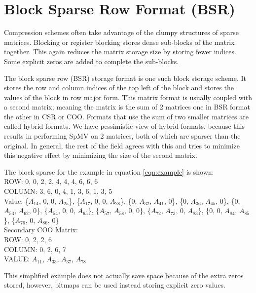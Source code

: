 \section{Block Sparse Row Format (BSR)}
\par Compression schemes often take advantage of the clumpy structures of sparse matrices. Blocking or register blocking stores dense sub-blocks of the matrix together. This again reduces the matrix storage size by storing fewer indices. Some explicit zeros are added to complete the sub-blocks.
\par The block sparse row (BSR) storage format is one such block storage scheme. It stores the row and column indices of the top left of the block and stores the values of the block in row major form. This matrix format is usually coupled with a second matrix; meaning the matrix is the sum of 2 matrices one in BSR format the other in CSR or COO. Formats that use the sum of two smaller matrices are called hybrid formats. We have pessimistic view of hybrid formats, because this results in performing SpMV on 2 matrices, both of which are sparser than the original. In general, the rest of the field agrees with this and tries to minimize this negative effect by minimizing the size of the second matrix. \par
The block sparse for the example in equation \ref{eqn:example} is shown:\\
ROW: 0, 0, 2, 2, 4, 4, 4, 6, 6, 6\\
COLUMN: 3, 6, 0, 4, 1, 3, 6, 1, 3, 5 \\
Value: \{$A_{14}$, $0$, $0$, $A_{25}$\}, \{$A_{17}$, $0$, $0$, $A_{28}$\}, \{$0$, $A_{32}$, $A_{41}$, $0$\}, \{$0$, $A_{36}$, $A_{45}$, $0$\}, \{$0$, $A_{53}$, $A_{62}$, $0$\}, \{$A_{54}$, $0$, $0$, $A_{65}$\}, \{$A_{57}$, $A_{58}$, $0$, $0$\}, \{$A_{72}$, $A_{73}$, $0$, $A_{83}$\}, \{$0$, $0$, $A_{84}$, $A_{85}$\}, \{$A_{76}$, $0$, $A_{86}$, $0$\}\\
Secondary COO Matrix:\\
ROW: 0, 2, 2, 6\\
COLUMN: 0, 2, 6, 7\\
VALUE: $A_{11}$, $A_{33}$, $A_{37}$, $A_{78}$\par
This simplified example does not actually save space because of the extra zeros stored, however, bitmaps can be used instead storing explicit zero values.

